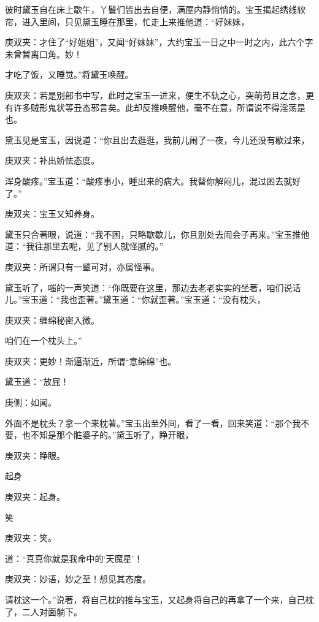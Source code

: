 \begin{parag}
    彼时黛玉自在床上歇午，丫鬟们皆出去自便，满屋内静悄悄的。宝玉揭起绣线软帘，进入里间，只见黛玉睡在那里，忙走上来推他道：“好妹妹，\begin{note}庚双夹：才住了“好姐姐”，又闻“好妹妹”，大约宝玉一日之中一时之内，此六个字未曾暂离口角。妙！\end{note}才吃了饭，又睡觉。”将黛玉唤醒。\begin{note}庚双夹：若是别部书中写，此时之宝玉一进来，便生不轨之心，突萌苟且之念，更有许多贼形鬼状等丑态邪言矣。此却反推唤醒他，毫不在意，所谓说不得淫荡是也。\end{note}黛玉见是宝玉，因说道：“你且出去逛逛，我前儿闹了一夜，今儿还没有歇过来，\begin{note}庚双夹：补出娇怯态度。\end{note}浑身酸疼。”宝玉道：“酸疼事小，睡出来的病大。我替你解闷儿，混过困去就好了。”\begin{note}庚双夹：宝玉又知养身。\end{note}黛玉只合著眼，说道：“我不困，只略歇歇儿，你且别处去闹会子再来。”宝玉推他道：“我往那里去呢，见了别人就怪腻的。”\begin{note}庚双夹：所谓只有一颦可对，亦属怪事。\end{note}
\end{parag}


\begin{parag}
    黛玉听了，嗤的一声笑道：“你既要在这里，那边去老老实实的坐著，咱们说话儿。”宝玉道：“我也歪著。”黛玉道：“你就歪著。”宝玉道：“没有枕头，\begin{note}庚双夹：缠绵秘密入微。\end{note}咱们在一个枕头上。”\begin{note}庚双夹：更妙！渐逼渐近，所谓“意绵绵”也。\end{note}黛玉道：“放屁！\begin{note}庚侧：如闻。\end{note}外面不是枕头？拿一个来枕著。”宝玉出至外间，看了一看，回来笑道：“那个我不要，也不知是那个脏婆子的。”黛玉听了，睁开眼，\begin{note}庚双夹：睁眼。\end{note}起身\begin{note}庚双夹：起身。\end{note}笑\begin{note}庚双夹：笑。\end{note}道：“真真你就是我命中的‘天魔星’！\begin{note}庚双夹：妙语，妙之至！想见其态度。\end{note}请枕这一个。”说著，将自己枕的推与宝玉，又起身将自己的再拿了一个来，自己枕了，二人对面躺下。
\end{parag}


